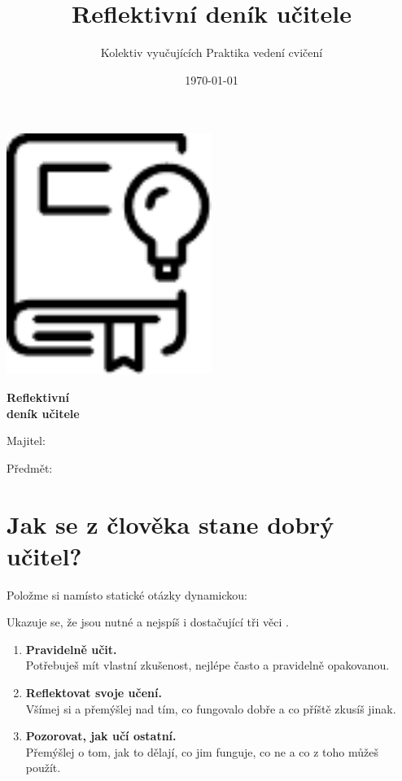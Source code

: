 \documentclass[twoside,openany]{book}
\title{Reflektivní deník učitele}
\author{Kolektiv vyučujících Praktika vedení cvičení}
\date{\today}
\newlength{\spc} %
\newcommand{\punct}[1]{%
  \settowidth{\spc}{#1}%
  \addtolength{\spc}{-1.8\spc}%
  #1%
  \hspace*{\spc}%
}
\begin{document}
\begin{titlepage}
	\centering
    \vspace*{1cm}
	\includegraphics[width=0.5\textwidth]{img/diary}\par
	\vspace{0.5cm}
	{\huge\bfseries Reflektivní\\ deník učitele\par}
	\vfill
	\raggedright
    \Large
	Majitel:\par
    \vspace{0.2cm}
    Předmět:\par
\end{titlepage}


\chapter*{Jak se z člověka stane dobrý učitel?}

\vspace*{1em}
Položme si namísto statické otázky dynamickou:

\vspace*{1em}
\textit{\large {}}

\vspace*{1em}
Ukazuje se, že jsou nutné a nejspíš i dostačující tři věci\punct{.}\footnotemark
{}
\begin{enumerate}
\item \textbf{Pravidelně učit.} \\Potřebuješ mít vlastní zkušenost, nejlépe často a pravidelně opakovanou.
\item \textbf{Reflektovat svoje učení.} \\Všímej si a přemýšlej nad tím, co fungovalo dobře a co příště zkusíš jinak.
\item \textbf{Pozorovat, jak učí ostatní.} \\Přemýšlej o tom, jak to dělají, co jim funguje, co ne a co z toho můžeš použít. 
\end{enumerate}
\end{document}
